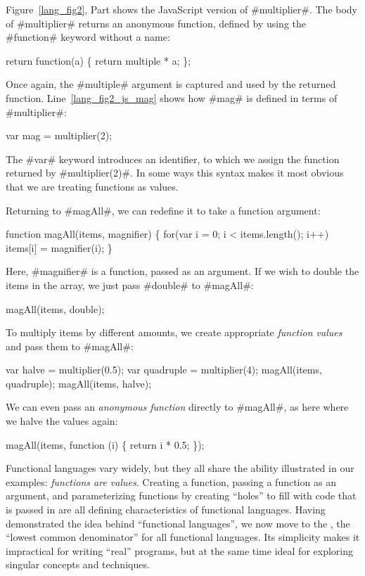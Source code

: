 \documentclass[12pt]{report}
\begin{document}
Figure~\ref{lang_fig2}, Part  shows the JavaScript
version of #multiplier#. The body of #multiplier# returns an anonymous
function, defined by using the #function# keyword without a name:
\begin{AVerb}
  return function(a) \{ 
    return multiple * a;
  \};
\end{AVerb}

Once again, the #multiple# argument is captured and used by the
returned function. Line~\ref{lang_fig2_js_mag} shows how #mag#
is defined in terms of #multiplier#:

\begin{AVerb}
  var mag = multiplier(2);
\end{AVerb}

The #var# keyword introduces an identifier, to which we assign the
function returned by #multiplier(2)#. In some ways this syntax makes
it most obvious that we are treating functions as values.

Returning to #magAll#, we can redefine it to take a function argument:
\begin{AVerb}
function magAll(items, magnifier) \{
  for(var i = 0; i < items.length(); i++)
    items[i] = magnifier(i);
\}
\end{AVerb}
Here, #magnifier# is a function, passed as an argument. If 
we wish to double the items in the array, we just pass #double#
to #magAll#:
\begin{AVerb}
  magAll(items, double);
\end{AVerb}
To multiply items by different amounts, we create appropriate
\emph{function values} and pass them to #magAll#:
\begin{AVerb}
  var halve = multiplier(0.5);
  var quadruple = multiplier(4);
  magAll(items, quadruple);
  magAll(items, halve);
\end{AVerb}
We can even pass an \emph{anonymous function} directly to 
#magAll#, as here where we halve the values again:
\begin{AVerb}
  magAll(items, function (i) \{ return i * 0.5; \});
\end{AVerb}

Functional languages vary widely, but they all share the ability
illustrated in our examples: \emph{functions are values}. Creating a
function, passing a function as an argument, and parameterizing
functions by creating ``holes'' to fill with code that is passed in
are all defining characteristics of functional languages.  Having
demonstrated the idea behind ``functional languages'', we now move to
the \lamA, the ``lowest common denominator'' for all functional
languages. Its simplicity makes it impractical for writing ``real''
programs, but at the same time ideal for exploring singular concepts
and techniques.
\end{document}
